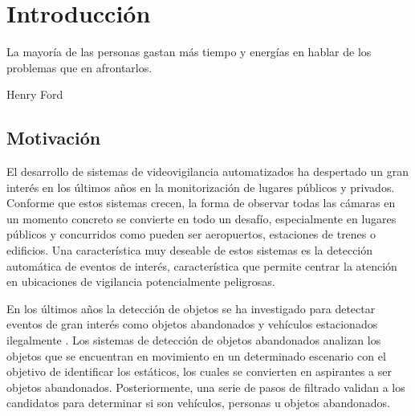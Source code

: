 
\chapter{Introducción}
\label{cha:introduccion}

\begin{FraseCelebre}
  \begin{Frase}
    La mayoría de las personas gastan más tiempo y energías en hablar de los problemas que en afrontarlos.
  \end{Frase}
  \begin{Fuente}
    Henry Ford
  \end{Fuente}
\end{FraseCelebre}

\section{Motivación}
\label{sec:motivacion}

El desarrollo de sistemas de videovigilancia automatizados ha despertado un gran interés en los últimos años en la monitorización de lugares públicos y privados. Conforme que estos sistemas crecen, la forma de observar todas las cámaras en un momento concreto se convierte en todo un desafío, especialmente en lugares públicos y concurridos como pueden ser aeropuertos, estaciones de trenes o edificios. Una característica muy deseable de estos sistemas es la detección automática de eventos de interés, característica que permite centrar la atención en ubicaciones de vigilancia potencialmente peligrosas.

En los últimos años la detección de objetos se ha investigado para detectar eventos de gran interés como objetos abandonados \cite{filonenko2016unattended} y vehículos estacionados ilegalmente \cite{Wahyono2017CumulativeDF}. Los sistemas de detección de objetos abandonados analizan los objetos que se encuentran en movimiento en un determinado escenario con el objetivo de identificar los estáticos, los cuales se convierten en aspirantes a ser objetos abandonados. Posteriormente, una serie de pasos de filtrado validan a los candidatos para determinar si son vehículos, personas u objetos abandonados.

